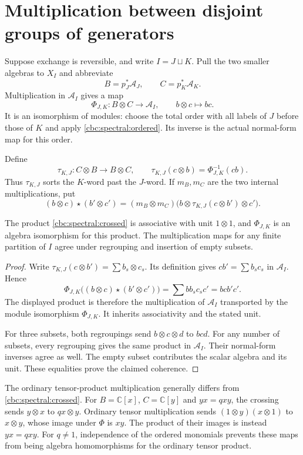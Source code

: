 \section{Multiplication between disjoint groups of generators}
Suppose exchange is reversible, and write $I=J\sqcup K$.
Pull the two smaller algebras to $X_I$ and abbreviate
\[
 B=p_J^*\mathcal A_J,\qquad C=p_K^*\mathcal A_K.
\]
Multiplication in $\mathcal A_I$ gives a map
\[
 \Phi_{J,K}:B\otimes C\longrightarrow\mathcal A_I,
 \qquad b\otimes c\longmapsto bc.
\]
It is an isomorphism of modules: choose the total order with all labels
of $J$ before those of $K$ and apply \eqref{cbc:spectral:ordered}.
Its inverse is the actual normal-form map for this order.

Define
\[
 \tau_{K,J}:C\otimes B\longrightarrow B\otimes C,
 \qquad \tau_{K,J}(c\otimes b)=\Phi_{J,K}^{-1}(cb).
\]
Thus $\tau_{K,J}$ sorts the $K$-word past the $J$-word.
If $m_B,m_C$ are the two internal multiplications, put
\begin{equation}\label{cbc:spectral:crossed}
 (b\otimes c)\star(b'\otimes c')
 =(m_B\otimes m_C)\bigl(b\otimes\tau_{K,J}(c\otimes b')\otimes c'\bigr).
\end{equation}

\begin{proposition}\label{cbc:spectral:blocks}
The product \eqref{cbc:spectral:crossed} is associative with unit
$1\otimes1$, and $\Phi_{J,K}$ is an algebra isomorphism for this product.
The multiplication maps for any finite partition of $I$ agree under
regrouping and insertion of empty subsets.
\end{proposition}
\begin{proof}
Write $\tau_{K,J}(c\otimes b')=\sum b_s\otimes c_s$.
Its definition gives $cb'=\sum b_sc_s$ in $\mathcal A_I$.  Hence
\[
 \Phi_{J,K}\bigl((b\otimes c)\star(b'\otimes c')\bigr)
 =\sum bb_sc_sc'=bc b'c'.
\]
The displayed product is therefore the multiplication of $\mathcal A_I$
transported by the module isomorphism $\Phi_{J,K}$.  It inherits
associativity and the stated unit.

For three subsets, both regroupings send $b\otimes c\otimes d$ to $bcd$.
For any number of subsets, every regrouping gives the same product in
$\mathcal A_I$.  Their normal-form inverses agree as well.
The empty subset contributes the scalar algebra and its unit.
These equalities prove the claimed coherence.
\end{proof}

The ordinary tensor-product multiplication generally differs from
\eqref{cbc:spectral:crossed}.  For $B=\mathbb C[x]$, $C=\mathbb C[y]$ and
$yx=qxy$, the crossing sends $y\otimes x$ to $q x\otimes y$.
Ordinary tensor multiplication sends
$(1\otimes y)(x\otimes1)$ to $x\otimes y$, whose image under $\Phi$ is $xy$.
The product of their images is instead $yx=qxy$.
For $q\ne1$, independence of the ordered monomials prevents these maps
from being algebra homomorphisms for the ordinary tensor product.

